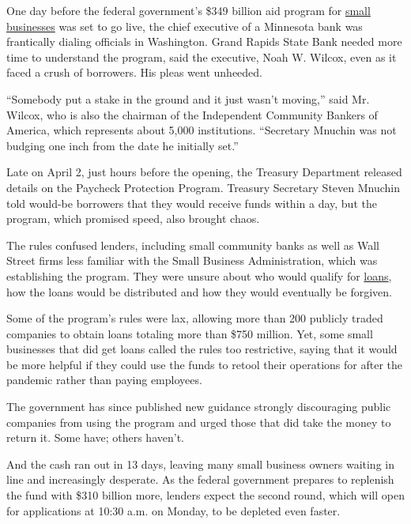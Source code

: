 One day before the federal government's \$349 billion aid program for
\href{https://www.nytimes3xbfgragh.onion/2020/05/13/business/paycheck-protection-program-small-business.html}{small
businesses} was set to go live, the chief executive of a Minnesota bank
was frantically dialing officials in Washington. Grand Rapids State Bank
needed more time to understand the program, said the executive, Noah W.
Wilcox, even as it faced a crush of borrowers. His pleas went unheeded.

``Somebody put a stake in the ground and it just wasn't moving,'' said
Mr. Wilcox, who is also the chairman of the Independent Community
Bankers of America, which represents about 5,000 institutions.
``Secretary Mnuchin was not budging one inch from the date he initially
set.''

Late on April 2, just hours before the opening, the Treasury Department
released details on the Paycheck Protection Program. Treasury Secretary
Steven Mnuchin told would-be borrowers that they would receive funds
within a day, but the program, which promised speed, also brought chaos.

The rules confused lenders, including small community banks as well as
Wall Street firms less familiar with the Small Business Administration,
which was establishing the program. They were unsure about who would
qualify for
\href{https://www.nytimes3xbfgragh.onion/2020/05/13/business/paycheck-protection-program-small-business.html}{loans},
how the loans would be distributed and how they would eventually be
forgiven.

Some of the program's rules were lax, allowing more than 200 publicly
traded companies to obtain loans totaling more than \$750 million. Yet,
some small businesses that did get loans called the rules too
restrictive, saying that it would be more helpful if they could use the
funds to retool their operations for after the pandemic rather than
paying employees.

The government has since published new guidance strongly discouraging
public companies from using the program and urged those that did take
the money to return it. Some have; others haven't.

And the cash ran out in 13 days, leaving many small business owners
waiting in line and increasingly desperate. As the federal government
prepares to replenish the fund with \$310 billion more, lenders expect
the second round, which will open for applications at 10:30 a.m. on
Monday, to be depleted even faster.

